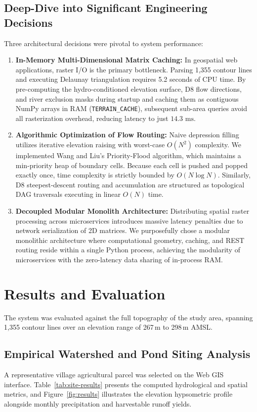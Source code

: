 \documentclass[manuscript,screen,review]{acmart}
\begin{document}
\subsection{Deep-Dive into Significant Engineering Decisions}
Three architectural decisions were pivotal to system performance:
\begin{enumerate}
    \item \textbf{In-Memory Multi-Dimensional Matrix Caching:} In geospatial web applications, raster I/O is the primary bottleneck. Parsing 1,355 contour lines and executing Delaunay triangulation requires 5.2 seconds of CPU time. By pre-computing the hydro-conditioned elevation surface, D8 flow directions, and river exclusion masks during startup and caching them as contiguous NumPy arrays in RAM (\texttt{TERRAIN\_CACHE}), subsequent sub-area queries avoid all rasterization overhead, reducing latency to just $14.3\text{ ms}$.
    \item \textbf{Algorithmic Optimization of Flow Routing:} Naive depression filling utilizes iterative elevation raising with worst-case $O(N^2)$ complexity. We implemented Wang and Liu's Priority-Flood algorithm, which maintains a min-priority heap of boundary cells. Because each cell is pushed and popped exactly once, time complexity is strictly bounded by $O(N \log N)$. Similarly, D8 steepest-descent routing and accumulation are structured as topological DAG traversals executing in linear $O(N)$ time.
    \item \textbf{Decoupled Modular Monolith Architecture:} Distributing spatial raster processing across microservices introduces massive latency penalties due to network serialization of 2D matrices. We purposefully chose a modular monolithic architecture where computational geometry, caching, and REST routing reside within a single Python process, achieving the modularity of microservices with the zero-latency data sharing of in-process RAM.
\end{enumerate}

\section{Results and Evaluation}
\label{sec:results}
The system was evaluated against the full topography of the study area, spanning 1,355 contour lines over an elevation range of 267\,m to 298\,m AMSL.

\subsection{Empirical Watershed and Pond Siting Analysis}
A representative village agricultural parcel was selected on the Web GIS interface. Table~\ref{tab:site-results} presents the computed hydrological and spatial metrics, and Figure~\ref{fig:results} illustrates the elevation hypsometric profile alongside monthly precipitation and harvestable runoff yields.
\end{document}
